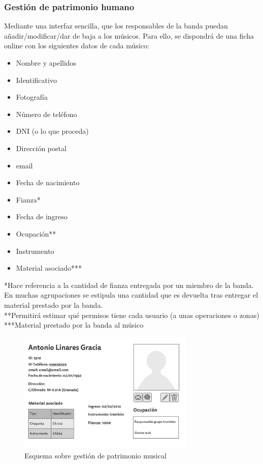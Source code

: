 \documentclass[11pt,spanish]{article}
\begin{document}
\subsubsection{Gestión de patrimonio humano}
Mediante una interfaz sencilla, que los responsables de la banda puedan añadir/modificar/dar
de baja a los músicos. Para ello, se dispondrá de una ficha online con los siguientes datos de cada músico:
\begin{itemize}
  \item Nombre y apellidos
  \item Identificativo
  \item Fotografía
  \item Número de teléfono
  \item DNI (o lo que proceda)
  \item Dirección postal
  \item email
  \item Fecha de nacimiento
  \item Fianza*
  \item Fecha de ingreso
  \item Ocupación**
  \item Instrumento
  \item Material asociado***
\end{itemize}
\footnotesize{*Hace referencia a la cantidad de fianza entregada por un miembro
de la banda. En muchas agrupaciones se estipula una cantidad que es devuelta tras entregar
el material prestado por la banda.}\\
\footnotesize{**Permitirá estimar qué permisos tiene cada usuario (a unas operaciones
o zonas)}\\
\footnotesize{***Material prestado por la banda al músico}

\begin{figure}[!h]
\centering
\includegraphics[width=0.75\textwidth]{img/patrimoniohumano.jpg}
\caption{Esquema sobre gestión de patrimonio musical}
\end{figure}
\end{document}
